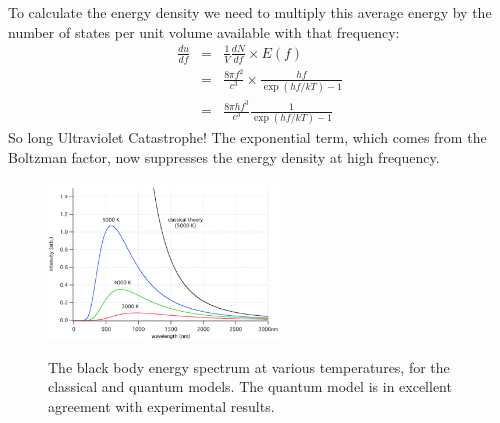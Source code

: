 \documentclass[12pt]{article}
\begin{document}
To calculate the energy density we need to multiply this average energy by the number of states per unit volume available with that frequency:
\begin{eqnarray*}
\frac{du}{df} &=& \frac{1}{V} \frac{dN}{df} \times E(f) \\
&=& \frac{8 \pi f^2}{c^3} \times \frac{hf}{\exp(hf/kT)-1} \\
&=& \frac{8 \pi h f^3}{c^3} \frac{1}{\exp(hf/kT)-1}
\end{eqnarray*}
So long Ultraviolet Catastrophe!  The exponential term, which comes from the Boltzman factor, now suppresses the energy density at high frequency.

\begin{figure}[thb]
\begin{center}
{\includegraphics[width=0.55\textwidth]{figs/bbspectrum}}
\end{center}
\caption{\label{fig:nspace} The black body energy spectrum at various temperatures, for the classical and quantum models.  The quantum model is in excellent agreement with experimental results.}
\end{figure}


\end{document}
